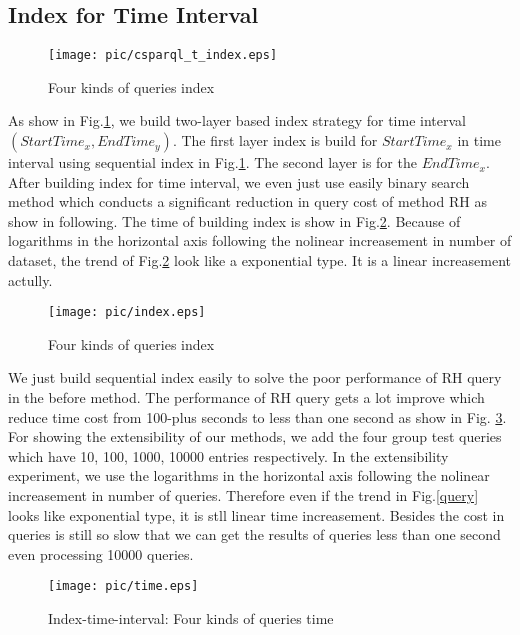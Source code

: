 \subsection{Index for Time Interval}

\begin{figure}[H]
	\centering
	\texttt{[image: pic/csparql\_t\_index.eps]}\\
	\caption{Four kinds of queries index}
	\label{index_p}
\end{figure}

As show in Fig.\ref{index_p}, we build two-layer based index strategy for time interval ${(Start Time_x, End Time_y)}$.
The first layer index is build for $Start Time_x$ in time interval using sequential index in Fig.\ref{index_p}. The 
second layer is for the $End Time_x$. After building index for time interval, we even just use easily binary search method
which conducts a significant reduction in query cost of method RH as show in following. The time of building index is show 
in Fig.\ref{index}. Because of logarithms in the horizontal axis following the nolinear increasement in number of dataset, 
the trend of Fig.\ref{index} look like a exponential type. It is a linear increasement actully.

\begin{figure}[H]
	\centering
	\texttt{[image: pic/index.eps]}\\
	\caption{Four kinds of queries index}
	\label{index}
\end{figure}


We just build sequential index easily to solve the poor performance of RH query in the before method. The performance 
of RH query gets a lot improve which reduce time cost from 100-plus seconds to less than one second as show in Fig.
\ref{time-idx}. For showing the  extensibility of our methods, we add the four group test queries which have 10, 100, 
1000, 10000 entries respectively. In the extensibility experiment, we use the logarithms in the horizontal axis following
the nolinear increasement in number of queries. Therefore even if the trend in Fig.\ref{query} looks like exponential type, 
it is stll linear time increasement. Besides the cost in queries is still so slow that we can get the results of queries less
than one second even processing 10000 queries.
\begin{figure}[H]
	\centering
	\texttt{[image: pic/time.eps]}\\
	\caption{Index-time-interval: Four kinds of queries time}
	\label{time-idx}
\end{figure}

